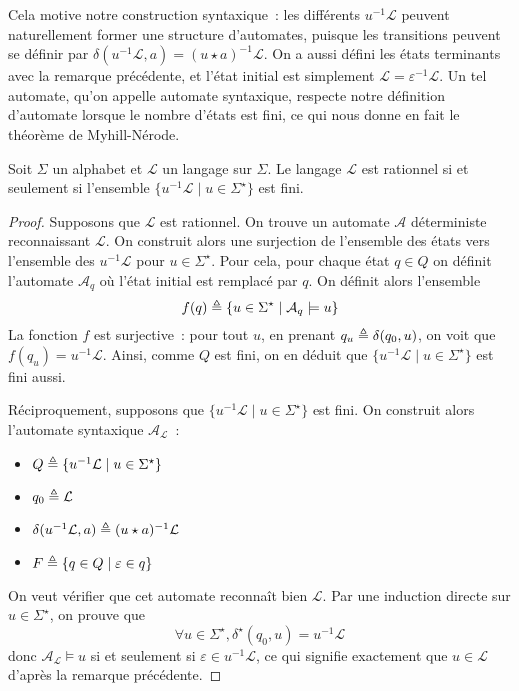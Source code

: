 Cela motive notre construction syntaxique~: les différents $u^{-1}\mathcal L$
peuvent naturellement former une structure d'automates, puisque les transitions
peuvent se définir par $\delta(u^{-1}\mathcal L,a) = (u\star a)^{-1}\mathcal L$.
On a aussi défini les états terminants avec la remarque précédente, et l'état
initial est simplement $\mathcal L = \varepsilon^{-1}\mathcal L$. Un tel
automate, qu'on appelle automate syntaxique, respecte notre définition
d'automate lorsque le nombre d'états est fini, ce qui nous donne en fait le
théorème de Myhill-Nérode.

\begin{theorem}
  Soit $\Sigma$ un alphabet et $\mathcal L$ un langage sur $\Sigma$. Le langage
  $\mathcal L$ est rationnel si et seulement si l'ensemble
  $\{u^{-1}\mathcal L\mid u \in \Sigma^\star\}$ est fini.
\end{theorem}

\begin{proof}
  Supposons que $\mathcal L$ est rationnel. On trouve un automate $\mathcal A$
  déterministe reconnaissant $\mathcal L$. On construit alors une surjection de
  l'ensemble des états vers l'ensemble des $u^{-1}\mathcal L$ pour
  $u\in \Sigma^\star$. Pour cela, pour chaque état $q \in Q$ on définit
  l'automate $\mathcal A_q$ où l'état initial est remplacé par $q$. On définit
  alors l'ensemble
  \[f(q) \triangleq \{u \in \Sigma^\star\mid \mathcal A_q \models u\}\]
  La fonction $f$ est surjective~: pour tout $u$, en prenant
  $q_u \triangleq \delta(q_0,u)$, on voit que $f(q_u) = u^{-1}\mathcal L$. Ainsi,
  comme $Q$ est fini, on en déduit que
  $\{u^{-1}\mathcal L\mid u \in \Sigma^\star\}$ est fini aussi.

  Réciproquement, supposons que $\{u^{-1}\mathcal L\mid u \in \Sigma^\star\}$
  est fini. On construit alors l'automate syntaxique $\mathcal A_{\mathcal L}$~:
  \begin{itemize}
  \item $Q \triangleq \{u^{-1}\mathcal L\mid u \in \Sigma^\star\}$
  \item $q_0 \triangleq \mathcal L$
  \item $\delta(u^{-1}\mathcal L, a) \triangleq (u\star a)^{-1}\mathcal L$
  \item $F \triangleq \{q \in Q\mid \varepsilon \in q\}$
  \end{itemize}
  On veut vérifier que cet automate reconnaît bien $\mathcal L$. Par une
  induction directe sur $u \in \Sigma^\star$, on prouve que
  \[\forall u \in \Sigma^\star, \delta^\star(q_0,u) = u^{-1}\mathcal L\]
  donc $\mathcal A_\mathcal L \models u$ si et seulement si
  $\varepsilon \in u^{-1}\mathcal L$, ce qui signifie exactement que
  $u \in \mathcal L$ d'après la remarque précédente.
\end{proof}

